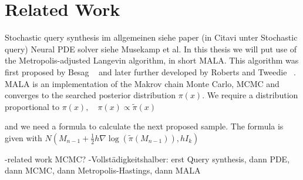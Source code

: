 \chapter{Related Work}
Stochastic query synthesis im allgemeinen siehe paper (in Citavi unter Stochastic query)
Neural PDE solver siehe Musekamp et al.
In this thesis we will put use of the Metropolis-adjusted Langevin algorithm, in short MALA. This algorithm was first proposed by Besag ~\cite{BesagComment}
and later further developed by Roberts and Tweedie ~\cite{roberts1996exponential}. MALA is an implementation of the Makrov chain Monte Carlo, MCMC and converges to the searched posterior distribution $\pi(x)$.
We require a distribution proportional to 
$\pi(x), \quad \pi(x) \propto \tilde{\pi}(x)$

 and we need a formula to calculate the next 
proposed sample. The formula is given with 
$N(M_{n-1} + \frac{1}{2} h \nabla \log(\tilde{\pi}(M_{n-1})), h I_k)$

-related work MCMC?
-Vollstädigkeitshalber: erst Query synthesis, dann PDE, dann MCMC, dann Metropolis-Hastings, dann MALA